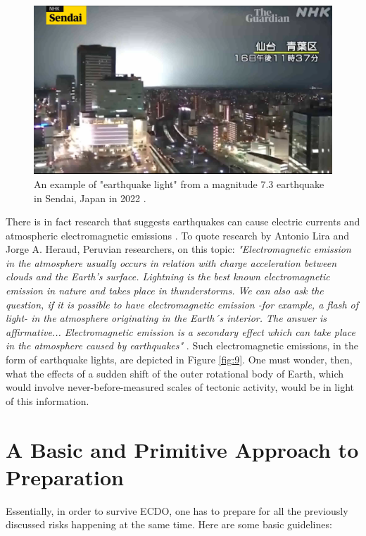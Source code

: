 \documentclass[10pt,twocolumn,letterpaper]{article}
\begin{document}
\begin{figure}[t]
\begin{center}
   \includegraphics[width=1\linewidth]{sendai.png}
\end{center}
   \caption{An example of "earthquake light" from a magnitude 7.3 earthquake in Sendai, Japan in 2022 \cite{48}.}
\label{fig:9}
\label{fig:onecol}
\end{figure}

There is in fact research that suggests earthquakes can cause electric currents and atmospheric electromagnetic emissions \cite{49,50}. To quote research by Antonio Lira and Jorge A. Heraud, Peruvian researchers, on this topic: \textit{"Electromagnetic emission in the atmosphere usually occurs in relation with charge acceleration between clouds and the Earth’s surface. Lightning is the best known electromagnetic emission in nature and takes place in thunderstorms. We can also ask the question, if it is possible to have electromagnetic emission -for example, a flash of light- in the atmosphere originating in the Earth´s interior. The answer is affirmative... Electromagnetic emission is a secondary effect which can take place in the atmosphere caused by earthquakes"} \cite{50}. Such electromagnetic emissions, in the form of earthquake lights, are depicted in Figure \ref{fig:9}. One must wonder, then, what the effects of a sudden shift of the outer rotational body of Earth, which would involve never-before-measured scales of tectonic activity, would be in light of this information.

\section{A Basic and Primitive Approach to Preparation}

Essentially, in order to survive ECDO, one has to prepare for all the previously discussed risks happening at the same time. Here are some basic guidelines:
\end{document}
